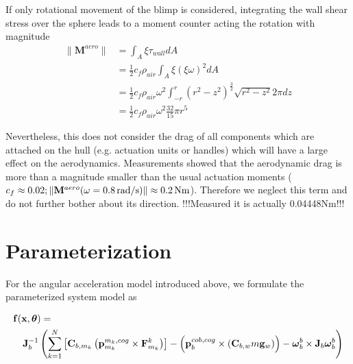 If only rotational movement of the blimp is considered, integrating the wall shear stress over the sphere leads to a moment counter acting the rotation with magnitude
\begin{align*}
\| \mathbf{M}^{aero} \|
&= \int_A \xi \tau_{wall} dA \\
&= \frac{1}{2} c_f \rho_{air} \int_A \xi (\xi \omega)^2 dA \\
&= \frac{1}{2} c_f \rho_{air} \omega^2 \int_{-r}^{r} (r^2-z^2)^{\frac{3}{2}} \sqrt{r^2-z^2} 2\pi dz \\
&= \frac{1}{2} c_f \rho_{air} \omega^2 \frac{32}{15} \pi r^5
\end{align*}

Nevertheless, this does not consider the drag of all components which are attached on the hull (e.g. actuation units or handles) which will have a large effect on the aerodynamics.
Measurements showed that the aerodynamic drag is more than a magnitude smaller than the usual actuation moments ($c_f \approx 0.02; \|\mathbf{M}^{aero}(\omega = \unit[0.8]{rad/s})\| \approx \unit[0.2]{Nm}$). Therefore we neglect this term and do not further bother about its direction.
!!!Measured it is actually 0.04448Nm!!!

%
%

\section{Parameterization}
For the angular acceleration model introduced above, we formulate the parameterized system model as

\begin{eqnarray}
\label{eq:sys_mod}
\lefteqn{
\mathbf{f}(\mathbf{x}, \boldsymbol{\theta}) = {}} \\
& & {} \mathbf{J}_b^{-1} \left( 
\sum_{k=1}^N  \left[  \mathbf{C}_{b,m_k} \left( \mathbf{p}^{m_k,cog}_{m_k} \times \mathbf{F}^k_{m_k} \right)  \right]
-
\left( \mathbf{p}^{cob,cog}_b \times (\mathbf{C}_{b,w}m\mathbf{g}_w) \right)
- \boldsymbol{\omega}_b^b \times \mathbf{J}_b \boldsymbol{\omega}_b^b \right) \nonumber
\end{eqnarray}

